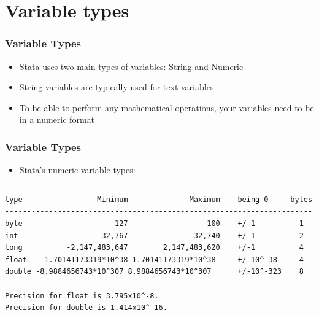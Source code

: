 \documentclass[table]{beamer}
\begin{document}
\section{Variable types}
\label{sec-5}
\begin{frame}
\frametitle{Variable Types}
\label{sec-5-1}

\begin{itemize}
\item Stata uses two main types of variables: String
  and Numeric
\item String variables are typically used for text
  variables
\item To be able to perform any mathematical
  operations, your variables need to be in a
  numeric format
\end{itemize}
\end{frame}
\begin{frame}[fragile]
\frametitle{Variable Types}
\label{sec-5-2}

\begin{itemize}
\item Stata's numeric variable types:
\end{itemize}


\vspace{-.5em}
 \begin{columns}
 \begin{block}{}
 \begin{verbatim}
type                 Minimum              Maximum    being 0     bytes
----------------------------------------------------------------------
byte                    -127                  100    +/-1          1
int                  -32,767               32,740    +/-1          2
long          -2,147,483,647        2,147,483,620    +/-1          4
float   -1.70141173319*10^38 1.70141173319*10^38     +/-10^-38     4
double -8.9884656743*10^307 8.9884656743*10^307      +/-10^-323    8
----------------------------------------------------------------------
Precision for float is 3.795x10^-8.
Precision for double is 1.414x10^-16.
\end{verbatim}
 \end{block}
 \end{columns}
 \vspace{.25em}
 
\end{frame}
\end{document}
